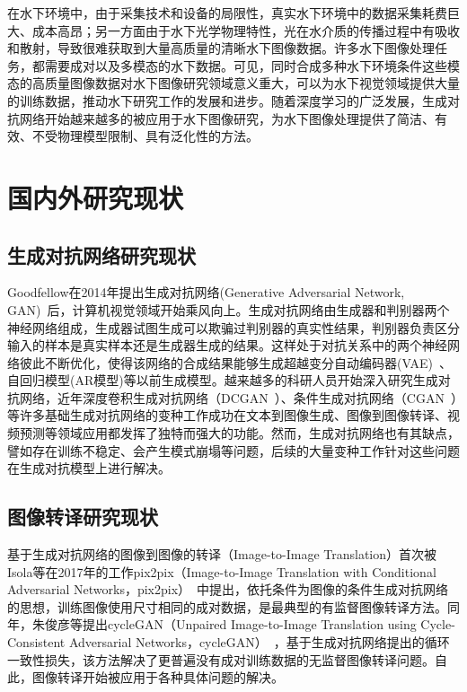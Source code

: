 在水下环境中，由于采集技术和设备的局限性，真实水下环境中的数据采集耗费巨大、成本高昂；另一方面由于水下光学物理特性，光在水介质的传播过程中有吸收和散射，导致很难获取到大量高质量的清晰水下图像数据。许多水下图像处理任务，都需要成对以及多模态的水下数据。可见，同时合成多种水下环境条件这些模态的高质量图像数据对水下图像研究领域意义重大，可以为水下视觉领域提供大量的训练数据，推动水下研究工作的发展和进步。随着深度学习的广泛发展，生成对抗网络开始越来越多的被应用于水下图像研究，为水下图像处理提供了简洁、有效、不受物理模型限制、具有泛化性的方法。


\section{国内外研究现状}
\subsection{生成对抗网络研究现状}
Goodfellow在2014年提出生成对抗网络(Generative Adversarial Network, GAN)~\cite{goodfellow2014generative}后，计算机视觉领域开始乘风向上。生成对抗网络由生成器和判别器两个神经网络组成，生成器试图生成可以欺骗过判别器的真实性结果，判别器负责区分输入的样本是真实样本还是生成器生成的结果。这样处于对抗关系中的两个神经网络彼此不断优化，使得该网络的合成结果能够生成超越变分自动编码器(VAE)~\cite{kingma2013auto}、自回归模型(AR模型)等以前生成模型。越来越多的科研人员开始深入研究生成对抗网络，近年深度卷积生成对抗网络（DCGAN~\cite{radford2015unsupervised}）、条件生成对抗网络（CGAN~\cite{mirza2014conditional}）等许多基础生成对抗网络的变种工作成功在文本到图像生成、图像到图像转译、视频预测等领域应用都发挥了独特而强大的功能。然而，生成对抗网络也有其缺点，譬如存在训练不稳定、会产生模式崩塌等问题，后续的大量变种工作针对这些问题在生成对抗模型上进行解决。


\subsection{图像转译研究现状}
基于生成对抗网络的图像到图像的转译（Image-to-Image Translation）首次被Isola等在2017年的工作pix2pix（Image-to-Image Translation with Conditional Adversarial Networks，pix2pix）~\cite{isola2017image}中提出，依托条件为图像的条件生成对抗网络的思想，训练图像使用尺寸相同的成对数据，是最典型的有监督图像转译方法。同年，朱俊彦等提出cycleGAN（Unpaired Image-to-Image Translation using Cycle-Consistent Adversarial Networks，cycleGAN）~\cite{zhu2017unpaired}，基于生成对抗网络提出的循环一致性损失，该方法解决了更普遍没有成对训练数据的无监督图像转译问题。自此，图像转译开始被应用于各种具体问题的解决。


